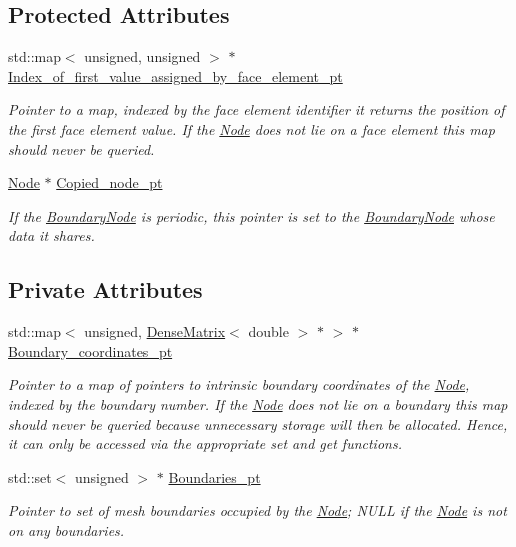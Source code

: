 \subsection*{Protected Attributes}
\begin{DoxyCompactItemize}
\item 
std\+::map$<$ unsigned, unsigned $>$ $\ast$ \hyperlink{classoomph_1_1BoundaryNodeBase_a950c7d3ab5b9ee0473b45b2a134728a7}{Index\+\_\+of\+\_\+first\+\_\+value\+\_\+assigned\+\_\+by\+\_\+face\+\_\+element\+\_\+pt}
\begin{DoxyCompactList}\small\item\em Pointer to a map, indexed by the face element identifier it returns the position of the first face element value. If the \hyperlink{classoomph_1_1Node}{Node} does not lie on a face element this map should never be queried. \end{DoxyCompactList}\item 
\hyperlink{classoomph_1_1Node}{Node} $\ast$ \hyperlink{classoomph_1_1BoundaryNodeBase_a4afcc250ee4d601a60f06d0d39ebaca0}{Copied\+\_\+node\+\_\+pt}
\begin{DoxyCompactList}\small\item\em If the \hyperlink{classoomph_1_1BoundaryNode}{Boundary\+Node} is periodic, this pointer is set to the \hyperlink{classoomph_1_1BoundaryNode}{Boundary\+Node} whose data it shares. \end{DoxyCompactList}\end{DoxyCompactItemize}
\subsection*{Private Attributes}
\begin{DoxyCompactItemize}
\item 
std\+::map$<$ unsigned, \hyperlink{classoomph_1_1DenseMatrix}{Dense\+Matrix}$<$ double $>$ $\ast$ $>$ $\ast$ \hyperlink{classoomph_1_1BoundaryNodeBase_a732b1ffccbcd7b79097a1779a94e9497}{Boundary\+\_\+coordinates\+\_\+pt}
\begin{DoxyCompactList}\small\item\em Pointer to a map of pointers to intrinsic boundary coordinates of the \hyperlink{classoomph_1_1Node}{Node}, indexed by the boundary number. If the \hyperlink{classoomph_1_1Node}{Node} does not lie on a boundary this map should never be queried because unnecessary storage will then be allocated. Hence, it can only be accessed via the appropriate set and get functions. \end{DoxyCompactList}\item 
std\+::set$<$ unsigned $>$ $\ast$ \hyperlink{classoomph_1_1BoundaryNodeBase_a18163a5bc2e0b6dfc487e249f3c24dd6}{Boundaries\+\_\+pt}
\begin{DoxyCompactList}\small\item\em Pointer to set of mesh boundaries occupied by the \hyperlink{classoomph_1_1Node}{Node}; N\+U\+LL if the \hyperlink{classoomph_1_1Node}{Node} is not on any boundaries. \end{DoxyCompactList}\end{DoxyCompactItemize}


